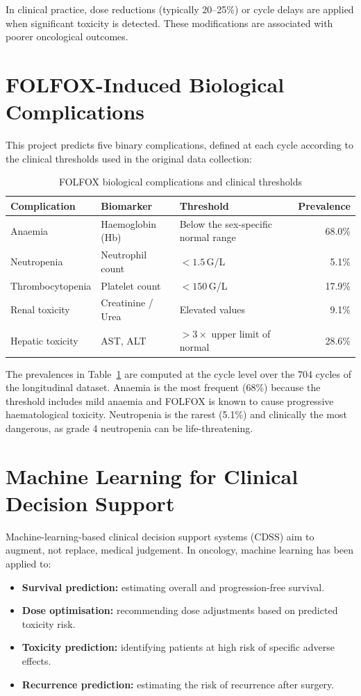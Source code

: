 \documentclass[12pt,a4paper]{report}
\begin{document}
In clinical practice, dose reductions (typically 20--25\%) or cycle delays are applied when significant toxicity is detected. These modifications are associated with poorer oncological outcomes.

\section{FOLFOX-Induced Biological Complications}

This project predicts five binary complications, defined at each cycle according to the clinical thresholds used in the original data collection:

\begin{table}[H]
\centering
\caption{FOLFOX biological complications and clinical thresholds}
\label{tab:complications}
\begin{tabular}{lllr}
\toprule
\textbf{Complication} & \textbf{Biomarker} & \textbf{Threshold} & \textbf{Prevalence} \\
\midrule
Anaemia & Haemoglobin (Hb) & Below the sex-specific normal range & 68.0\% \\
Neutropenia & Neutrophil count & $< 1.5$\,G/L & 5.1\% \\
Thrombocytopenia & Platelet count & $< 150$\,G/L & 17.9\% \\
Renal toxicity & Creatinine / Urea & Elevated values & 9.1\% \\
Hepatic toxicity & AST, ALT & $> 3\times$ upper limit of normal & 28.6\% \\
\bottomrule
\end{tabular}
\end{table}

The prevalences in Table~\ref{tab:complications} are computed at the cycle level over the 704 cycles of the longitudinal dataset. Anaemia is the most frequent (68\%) because the threshold includes mild anaemia and FOLFOX is known to cause progressive haematological toxicity. Neutropenia is the rarest (5.1\%) and clinically the most dangerous, as grade 4 neutropenia can be life-threatening.

\section{Machine Learning for Clinical Decision Support}

Machine-learning-based clinical decision support systems (CDSS) aim to augment, not replace, medical judgement. In oncology, machine learning has been applied to:
\begin{itemize}
  \item \textbf{Survival prediction:} estimating overall and progression-free survival.
  \item \textbf{Dose optimisation:} recommending dose adjustments based on predicted toxicity risk.
  \item \textbf{Toxicity prediction:} identifying patients at high risk of specific adverse effects.
  \item \textbf{Recurrence prediction:} estimating the risk of recurrence after surgery.
\end{itemize}
\end{document}
